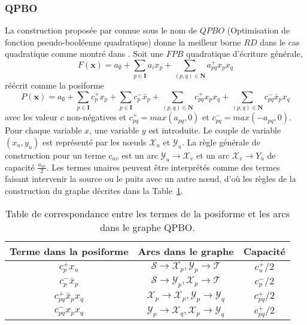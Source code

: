 \documentclass[../main/These_Mathias_Paget.tex]{subfiles}
\begin{document}
	\subsubsection{QPBO}
	La construction proposée par \cite{Boros02DAM} connue sous le nom de $QPBO$ (Optimisation de fonction pseudo-booléenne quadratique) donne la meilleur borne $RD$ dans le cas quadratique comme montré dans \cite{Kolmogorov10b} \cite{Kahl12DAM}. Soit une $FPB$ quadratique d'écriture générale,
	\begin{equation}
	F(\boldsymbol{x}) = a_{\emptyset} + \sum_{p \in \boldsymbol{I}}{a_ix_p} + \sum_{(p,q) \in \boldsymbol{N}}{a_{pq}^+x_px_q}
	\end{equation}	
	réécrit comme la posiforme
	\begin{equation}
	P(\boldsymbol{x}) = a_{\emptyset} + \sum_{p \in \boldsymbol{I}}{c_p^{+}x_p} + \sum_{p \in \boldsymbol{I}}{c_{p}^{-}\bar{x}_p} + \sum_{(p,q) \in \boldsymbol{N}}{c_{pq}^+x_px_q} + \sum_{(p,q) \in \boldsymbol{N}}{c_{pq}^-\bar{x}_px_q}
	\end{equation}
	avec les valeur $c$ non-négatives et $c_{pq}^{+}=max(a_{pq},0)$ et $c_{pq}^{-}=max({-}a_{pq},0)$.
	Pour chaque variable $x$, une variable $y$ est introduite. Le couple de variable $(x_u,y_u)$ est représenté par les nœuds $\mathcal{X}_u$ et $\mathcal{Y}_u$. La règle générale de construction pour un terme $c_{uv}$ est un arc $\mathcal{Y}_u\rightarrow \mathcal{X}_v$ et un arc $\mathcal{X}_v \rightarrow Y_u$ de capacité $\frac{a_{uv}}{2}$. Les termes unaires peuvent être interprétés comme des termes faisant intervenir la source ou le puits avec un autre nœud, d'où les règles de la construction du graphe décrites dans la Table~\ref{tab:constr_QPBO}.
	
	\begin{table}[hb]
		\renewcommand{\arraystretch}{1.2}
		\centering
		\begin{tabular}{c|c|c}
			Terme dans la posiforme & Arcs dans le graphe & Capacité \\				
			\hline
			$c_p^{+}x_u$ & $\mathcal{S} \rightarrow \mathcal{X}_p,\mathcal{Y}_p \rightarrow \mathcal{T}$ & $c_u^{+}/2$  \\
			$c_p^{-}\bar{x}_p$ & $\mathcal{S} \rightarrow \mathcal{Y}_p,\mathcal{X}_p \rightarrow \mathcal{T}$ & $c_p^{-}/2$ \\
			$c_{pq}^{+}\bar{x}_px_q$ & $\mathcal{X}_p \rightarrow \mathcal{X}_p,\mathcal{Y}_p \rightarrow \mathcal{Y}_q$ & $c_{pq}^{+}/2$ \\
			$c_{pq}^{-}x_px_q$ & $\mathcal{Y}_p \rightarrow \mathcal{X}_q ,\mathcal{X}_p \rightarrow \mathcal{Y}_q$ & $c_{pq}^{+}/2$ \\
		\end{tabular}
		\caption{Table de correspondance entre les termes de la posiforme et les arcs dans le graphe QPBO.}
		\label{tab:constr_QPBO}
	\end{table}
	
\end{document}
